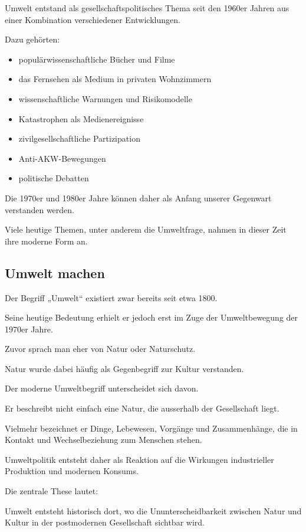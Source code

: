 Umwelt entstand als gesellschaftspolitisches Thema
seit den 1960er Jahren
aus einer Kombination verschiedener Entwicklungen.

Dazu gehörten:

\begin{itemize}
\item populärwissenschaftliche Bücher und Filme
\item das Fernsehen als Medium in privaten Wohnzimmern
\item wissenschaftliche Warnungen und Risikomodelle
\item Katastrophen als Medienereignisse
\item zivilgesellschaftliche Partizipation
\item Anti-AKW-Bewegungen
\item politische Debatten
\end{itemize}

Die 1970er und 1980er Jahre
können daher als Anfang unserer Gegenwart verstanden werden.

Viele heutige Themen,
unter anderem die Umweltfrage,
nahmen in dieser Zeit ihre moderne Form an.

\subsection{Umwelt machen}

Der Begriff „Umwelt“
existiert zwar bereits seit etwa 1800.

Seine heutige Bedeutung erhielt er jedoch erst
im Zuge der Umweltbewegung der 1970er Jahre.

Zuvor sprach man eher von Natur
oder Naturschutz.

Natur wurde dabei häufig als Gegenbegriff
zur Kultur verstanden.

Der moderne Umweltbegriff unterscheidet sich davon.

Er beschreibt nicht einfach eine Natur,
die ausserhalb der Gesellschaft liegt.

Vielmehr bezeichnet er Dinge,
Lebewesen,
Vorgänge
und Zusammenhänge,
die in Kontakt und Wechselbeziehung
zum Menschen stehen.

Umweltpolitik entsteht daher
als Reaktion auf die Wirkungen
industrieller Produktion
und modernen Konsums.

Die zentrale These lautet:

Umwelt entsteht historisch dort,
wo die Ununterscheidbarkeit
zwischen Natur und Kultur
in der postmodernen Gesellschaft sichtbar wird.

